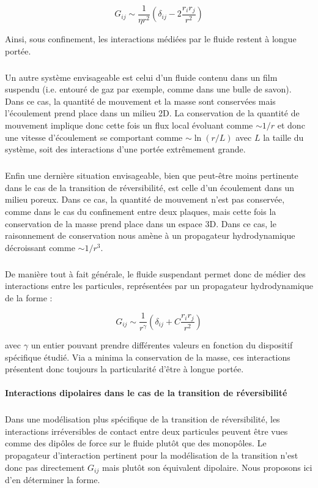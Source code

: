 \begin{equation}
	G_{ij} \sim \frac{1}{\eta r^2}\left( \delta_{ij}-2\frac{r_ir_j}{r^2} \right)
\end{equation}

\noindent Ainsi, sous confinement, les interactions médiées par le fluide restent à longue portée.

\subparagraph{}Un autre système envisageable est celui d'un fluide contenu dans un film suspendu (i.e. entouré de gaz par exemple, comme dans une bulle de savon). Dans ce cas, la quantité de mouvement et la masse sont conservées mais l'écoulement prend place dans un milieu 2D. La conservation de la quantité de mouvement implique donc cette fois un flux local évoluant comme $\sim 1/r$ et donc une vitesse d'écoulement se comportant comme $\sim \ln (r/L)$ avec $L$ la taille du système, soit des interactions d'une portée extrêmement grande.

\subparagraph{}Enfin une dernière situation envisageable, bien que peut-être moins pertinente dans le cas de la transition de réversibilité, est celle d'un écoulement dans un milieu poreux. Dans ce cas, la quantité de mouvement n'est pas conservée, comme dans le cas du confinement entre deux plaques, mais cette fois la conservation de la masse prend place dans un espace 3D. Dans ce cas, le raisonnement de conservation nous amène à un propagateur hydrodynamique décroissant comme $\sim 1/r^3$.

\subparagraph{}De manière tout à fait générale, le fluide suspendant permet donc de médier des interactions entre les particules, représentées par un propagateur hydrodynamique de la forme :

\begin{equation}
	G_{ij} \sim \frac{1}{r^\gamma}\left( \delta_{ij}+C\frac{r_ir_j}{r^2} \right)
\end{equation}

\noindent avec $\gamma$ un entier pouvant prendre différentes valeurs en fonction du dispositif spécifique étudié. Via a minima la conservation de la masse, ces interactions présentent donc toujours la particularité d'être à longue portée. 

\paragraph{Interactions dipolaires dans le cas de la transition de réversibilité}

\subparagraph{}Dans une modélisation plus spécifique de la transition de réversibilité, les interactions irréversibles de contact entre deux particules peuvent être vues comme des dipôles de force sur le fluide plutôt que des monopôles. Le propagateur d'interaction pertinent pour la modélisation de la transition n'est donc pas directement $G_{ij}$ mais plutôt son équivalent dipolaire. Nous proposons ici d'en déterminer la forme.

